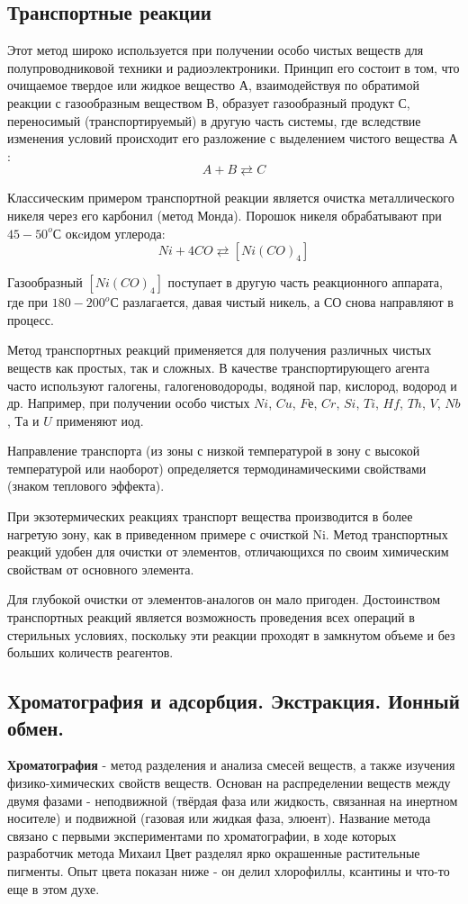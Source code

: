 \documentclass[14pt,a4paper]{scrartcl}
\begin{document}
\subsection*{Транспортные реакции}
Этот метод широко используется при получении особо чистых веществ для полупроводниковой техники и радиоэлектроники. Принцип его состоит в том, что очищаемое твердое или жидкое вещество $А$, взаимодействуя по обратимой реакции с газообразным веществом $В$, образует газообразный продукт $С$, переносимый (транспортируемый) в другую часть системы, где вследствие изменения условий происходит его разложение с выделением чистого вещества $А$:
$$A + B \rightleftarrows C$$

Классическим примером транспортной реакции является очистка металлического никеля через его карбонил (метод Монда). Порошок никеля обрабатывают при $45-50 ^oС$ окcидом углерода:
$$Ni + 4CO \rightleftarrows \left[Ni(CO)_4\right]$$

Газообразный $[Ni(CO)_4]$ поступает в другую часть реакционного аппарата, где при $180-200 ^oС$ разлагается, давая чистый никель, а $СО$ снова направляют в процесс.

Метод транспортных реакций применяется для получения различных чистых веществ как простых, так и сложных. В качестве транспортирующего агента часто используют галогены, галогеноводороды, водяной пар, кислород, водород и др. Например, при получении особо чистых $Ni$, $Cu$, $Fе$, $Cr$, $Si$, $Ti$, $Hf$, $Th$, $V$, $Nb$, $Та$ и $U$ применяют иод.

Направление транспорта (из зоны с низкой температурой в зону с высокой температурой или наоборот) определяется термодинамическими свойствами (знаком теплового эффекта).

При экзотермических реакциях транспорт вещества производится в более нагретую зону, как в приведенном примере с очисткой Ni. Метод транспортных реакций удобен для очистки от элементов, отличающихся по своим химическим свойствам от основного элемента.

Для глубокой очистки от элементов-аналогов он мало пригоден. Достоинством транспортных реакций является возможность проведения всех операций в стерильных условиях, поскольку эти реакции проходят в замкнутом объеме и без больших количеств реагентов.

\subsection*{Хроматография и адсорбция. Экстракция. Ионный обмен.} 
\textbf{Хроматография} -  метод разделения и анализа смесей веществ, а также изучения физико-химических свойств веществ. Основан на распределении веществ между двумя фазами - неподвижной (твёрдая фаза или жидкость, связанная на инертном носителе) и подвижной (газовая или жидкая фаза, элюент). Название метода связано с первыми экспериментами по хроматографии, в ходе которых разработчик метода Михаил Цвет разделял ярко окрашенные растительные пигменты. Опыт цвета показан ниже - он делил хлорофиллы, ксантины и что-то еще в этом духе.
\end{document}
